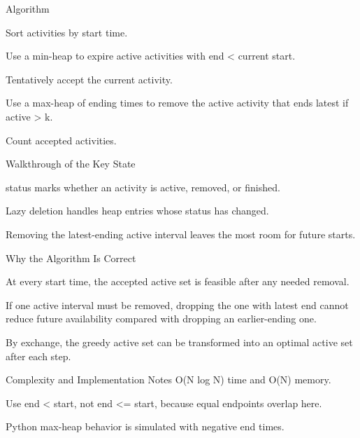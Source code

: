 \documentclass[aspectratio=169,11pt]{beamer}
\begin{document}
\begin{frame}{Algorithm}
\begin{tightitemize}
  \item Sort activities by start time.
  \item Use a min-heap to expire active activities with end < current start.
  \item Tentatively accept the current activity.
  \item Use a max-heap of ending times to remove the active activity that ends latest if active > k.
  \item Count accepted activities.
\end{tightitemize}
\end{frame}

\begin{frame}{Walkthrough of the Key State}
\begin{tightitemize}
  \item status marks whether an activity is active, removed, or finished.
  \item Lazy deletion handles heap entries whose status has changed.
  \item Removing the latest-ending active interval leaves the most room for future starts.
\end{tightitemize}
\end{frame}

\begin{frame}{Why the Algorithm Is Correct}
\begin{tightitemize}
  \item At every start time, the accepted active set is feasible after any needed removal.
  \item If one active interval must be removed, dropping the one with latest end cannot reduce future availability compared with dropping an earlier-ending one.
  \item By exchange, the greedy active set can be transformed into an optimal active set after each step.
\end{tightitemize}
\end{frame}

\begin{frame}{Complexity and Implementation Notes}
\small
{} O(N log N) time and O(N) memory.

\vspace{0.3cm}
\begin{tightitemize}
  \item Use end < start, not end <= start, because equal endpoints overlap here.
  \item Python max-heap behavior is simulated with negative end times.
\end{tightitemize}
\end{frame}
\end{document}
